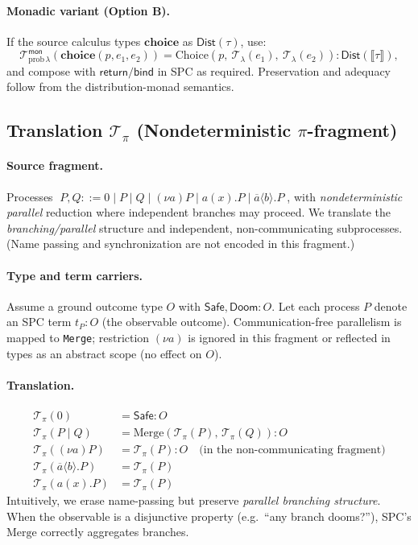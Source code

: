 \documentclass{article}
\begin{document}
\paragraph{Monadic variant (Option B).}
If the source calculus types $\mathbf{choice}$ as $\mathsf{Dist}(\tau)$, use:
\[
\mathcal{T}_{\mathrm{prob}\,\lambda}^{\mathsf{mon}}(\mathbf{choice}(p,e_1,e_2))
  = \mathrm{Choice}(p,\ \mathcal{T}_\lambda(e_1),\ \mathcal{T}_\lambda(e_2)) : \mathsf{Dist}(\llbracket \tau \rrbracket),
\]
and compose with $\mathsf{return}/\mathsf{bind}$ in SPC as required. Preservation and adequacy follow from the
distribution-monad semantics.

\subsection{Translation $\mathcal{T}_\pi$ (Nondeterministic $\pi$-fragment)}

\paragraph{Source fragment.}
Processes $\;P,Q ::= 0 \mid P \mid Q \mid (\nu a)P \mid a(x).P \mid \overline{a}\langle b\rangle.P\;$,
with \emph{nondeterministic parallel} reduction where independent branches may proceed.
We translate the \emph{branching/parallel} structure and independent, non-communicating
subprocesses. (Name passing and synchronization are not encoded in this fragment.)

\paragraph{Type and term carriers.}
Assume a ground outcome type $O$ with $\mathsf{Safe},\mathsf{Doom}:O$. Let each
process $P$ denote an SPC term $t_P:O$ (the observable outcome). Communication-free
parallelism is mapped to \texttt{Merge}; restriction $(\nu a)$ is ignored in this fragment
or reflected in types as an abstract scope (no effect on $O$).

\paragraph{Translation.}
\[
\begin{aligned}
\mathcal{T}_\pi(0) &= \mathsf{Safe} : O \\[3pt]
\mathcal{T}_\pi(P \mid Q) &= \mathrm{Merge}(\mathcal{T}_\pi(P),\,\mathcal{T}_\pi(Q)) : O \\[3pt]
\mathcal{T}_\pi((\nu a)P) &= \mathcal{T}_\pi(P) : O \quad\text{(in the non-communicating fragment)} \\[3pt]
\mathcal{T}_\pi(\overline{a}\langle b\rangle.P) &= \mathcal{T}_\pi(P) \\
\mathcal{T}_\pi(a(x).P) &= \mathcal{T}_\pi(P)
\end{aligned}
\]
Intuitively, we erase name-passing but preserve \emph{parallel branching structure}.
When the observable is a disjunctive property (e.g.\ ``any branch dooms?''), SPC’s
$\mathrm{Merge}$ correctly aggregates branches.
\end{document}
